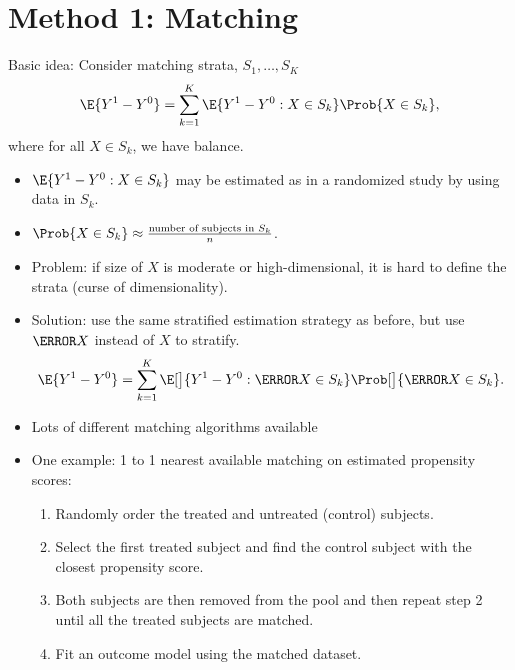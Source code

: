 \section{Method 1: Matching}
Basic idea: Consider matching strata, $ S_1,\ldots,S_K $
\[ \E{Y^1-Y^0}=\sum_{k=1}^{K}\E{Y^1-Y^0\given X\in S_k}\Prob{X\in S_k}, \]
where for all $ X\in S_k $, we have balance.
\begin{itemize}
      \item $ \E{Y^1-Y^0\given X\in S_k} $ may be estimated as in a randomized study by using data in $ S_k $.
      \item $ \Prob{X\in S_k}\approx \frac{\text{number of subjects in $S_k$}}{n} $.
      \item Problem: if size of $X$ is moderate or high-dimensional, it is
            hard to define the strata (curse of dimensionality).
      \item Solution: use the same stratified estimation strategy as
            before, but use $ \ps{X} $ instead of $X$ to stratify.
            \[ \E{Y^1-Y^0}=\sum_{k=1}^{K}\E[\big]{Y^1-Y^0\given \ps{X}\in S_k}\Prob[\big]{\ps{X}\in S_k}. \]
      \item Lots of different matching algorithms available
      \item One example: 1 to 1 nearest available matching on estimated
            propensity scores:
            \begin{enumerate}[1.]
                  \item Randomly order the treated and untreated (control) subjects.
                  \item Select the first treated subject and find the control subject with
                        the closest propensity score.
                  \item Both subjects are then removed from the pool and then repeat
                        step 2 until all the treated subjects are matched.
                  \item Fit an outcome model using the matched dataset.
            \end{enumerate}
\end{itemize}
